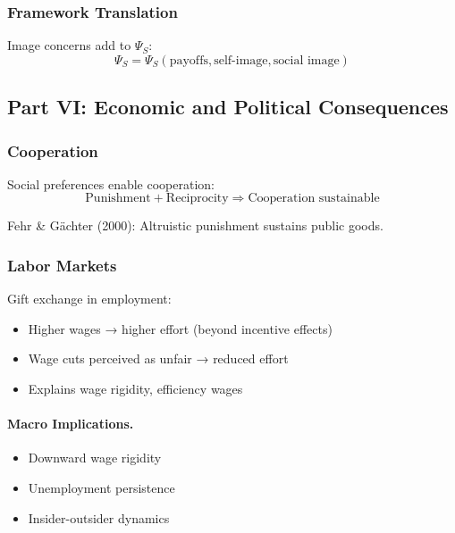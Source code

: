 \subsubsection{Framework Translation}

Image concerns add to $\Psi_S$:
\begin{equation}
\Psi_S = \Psi_S(\text{payoffs}, \text{self-image}, \text{social image})
\end{equation}

\subsection{Part VI: Economic and Political Consequences}

\subsubsection{Cooperation}

Social preferences enable cooperation:
\begin{equation}
\text{Punishment} + \text{Reciprocity} \Rightarrow \text{Cooperation sustainable}
\end{equation}

Fehr \& Gächter (2000): Altruistic punishment sustains public goods.

\subsubsection{Labor Markets}

Gift exchange in employment:
\begin{itemize}
    \item Higher wages → higher effort (beyond incentive effects)
    \item Wage cuts perceived as unfair → reduced effort
    \item Explains wage rigidity, efficiency wages
\end{itemize}

\paragraph{Macro Implications.}
\begin{itemize}
    \item Downward wage rigidity
    \item Unemployment persistence
    \item Insider-outsider dynamics
\end{itemize}

